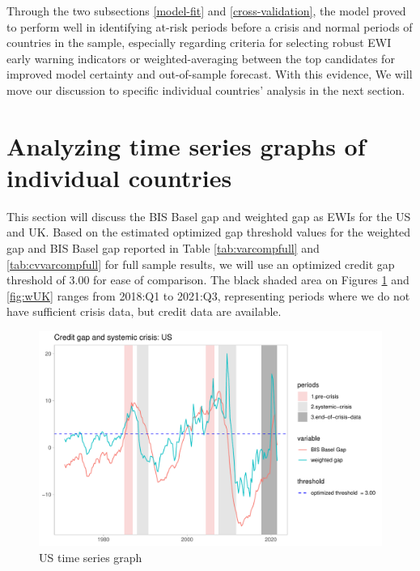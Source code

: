 \documentclass[
  12pt,
]{article}
\begin{document}
Through the two subsections \ref{model-fit} and \ref{cross-validation}, the model proved to perform well in identifying at-risk periods before a crisis and normal periods of countries in the sample, especially regarding criteria for selecting robust EWI early warning indicators or weighted-averaging between the top candidates for improved model certainty and out-of-sample forecast. With this evidence, We will move our discussion to specific individual countries' analysis in the next section.

\hypertarget{analyzing-time-series-graphs-of-individual-countries}{%
\section{Analyzing time series graphs of individual countries}\label{analyzing-time-series-graphs-of-individual-countries}}

This section will discuss the BIS Basel gap and weighted gap as EWIs for the US and UK. Based on the estimated optimized gap threshold values for the weighted gap and BIS Basel gap reported in Table \ref{tab:varcompfull} and \ref{tab:cvvarcompfull} for full sample results, we will use an optimized credit gap threshold of 3.00 for ease of comparison. The black shaded area on Figures \ref{fig:wUS} and \ref{fig:wUK} ranges from 2018:Q1 to 2021:Q3, representing periods where we do not have sufficient crisis data, but credit data are available.

\begin{figure}

{\centering \includegraphics[width=1\linewidth]{../Data/Output/Graphs/Weighted_credit_gap_US} 

}

\caption{US time series graph}\label{fig:wUS}
\end{figure}
\end{document}
